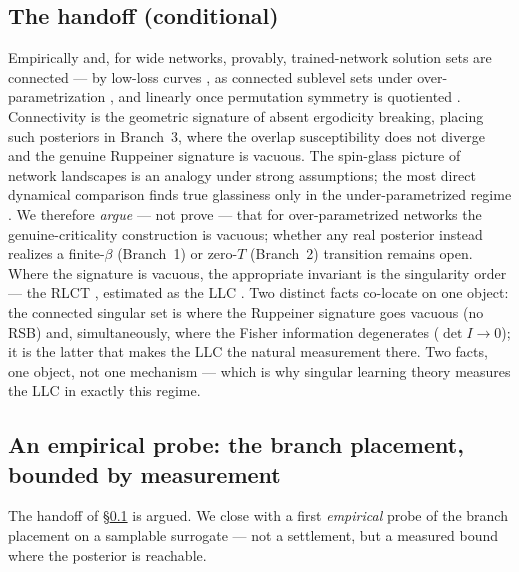 \documentclass[a4paper,11pt]{article}
\theoremstyle{plain}
\theoremstyle{definition}
\theoremstyle{remark}
\begin{document}
\subsection{The handoff (conditional)}\label{sec:gate-handoff}
Empirically and, for wide networks, provably, trained-network solution sets are connected --- by low-loss
curves \cite{garipov2018,draxler2018}, as connected sublevel sets under over-parametrization
\cite{nguyen2019}, and linearly once permutation symmetry is quotiented \cite{entezari2022,ainsworth2023}.
Connectivity is the geometric signature of absent ergodicity breaking, placing such posteriors in Branch~3,
where the overlap susceptibility does not diverge and the genuine Ruppeiner signature is vacuous. The
spin-glass picture of network landscapes \cite{choromanska2015} is an analogy under strong assumptions; the
most direct dynamical comparison finds true glassiness only in the under-parametrized regime
\cite{baityjesi2018}. We therefore \emph{argue} --- not prove --- that for over-parametrized networks the
genuine-criticality construction is vacuous; whether any real posterior instead realizes a finite-$\beta$
(Branch~1) or zero-$T$ (Branch~2) transition remains open. Where the signature is vacuous, the appropriate
invariant is the singularity order --- the RLCT \cite{watanabe2009}, estimated as the LLC \cite{lau2024}. Two
distinct facts co-locate on one
object: the connected singular set is where the Ruppeiner signature goes vacuous (no RSB) and,
simultaneously, where the Fisher information degenerates ($\det I\to0$); it is the latter that makes the LLC
the natural measurement there. Two facts, one object, not one mechanism --- which is why singular learning
theory measures the LLC in exactly this regime.

\subsection{An empirical probe: the branch placement, bounded by measurement}\label{sec:gate-empirical}
The handoff of \S\ref{sec:gate-handoff} is argued. We close with a first \emph{empirical} probe of the branch
placement on a samplable surrogate --- not a settlement, but a measured bound where the posterior is reachable.
\end{document}
